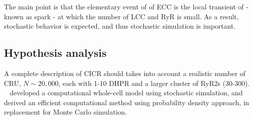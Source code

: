 The main point is that the elementary event of of ECC is the local
transient of  - known as  spark - at which the
number of LCC and RyR is small. As a result, stochastic behavior is
expected, and thus stochastic simulation is important.


\subsection{Hypothesis analysis}
\label{sec:hypothesis-analysis-11}

A complete description of CICR should takes into account a realistic
number of CRU, $N\sim 20,000$, each with 1-10 DHPR and a larger
cluster of RyR2s (30-300). ~\citep{williams2007pda} developed a
computational whole-cell model using stochastic simulation, and
derived an efficient computational method using probability density
approach, in replacement for Monte Carlo simulation.  


